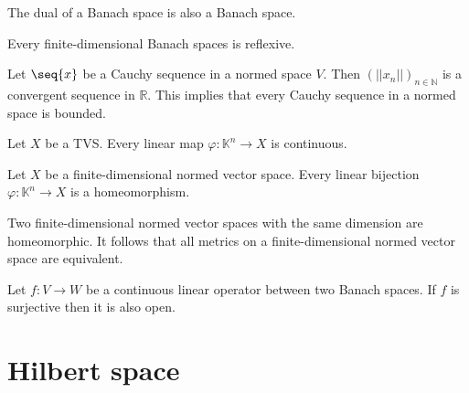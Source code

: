 
    \begin{property}
        The dual of a Banach space is also a Banach space.
    \end{property}
    \begin{property}
        Every finite-dimensional Banach spaces is reflexive.
    \end{property}

    \begin{property}
        Let $\seq{x}$ be a Cauchy sequence in a normed space $V$. Then $(||x_n||)_{n\in\mathbb{N}}$ is a convergent sequence in $\mathbb{R}$. This implies that every Cauchy sequence in a normed space is bounded.
    \end{property}

    \begin{property}
        Let $X$ be a TVS. Every linear map $\varphi:\mathbb{K}^n\rightarrow X$ is continuous.
    \end{property}
    \begin{property}
        Let $X$ be a finite-dimensional normed vector space. Every linear bijection $\varphi:\mathbb{K}^n\rightarrow X$ is a homeomorphism.
    \end{property}
    \begin{result}
        Two finite-dimensional normed vector spaces with the same dimension are homeomorphic. It follows that all metrics on a finite-dimensional normed vector space are equivalent.
    \end{result}

    \begin{theorem}
        Let $f:V\rightarrow W$ be a continuous linear operator between two Banach spaces. If $f$ is surjective then it is also open.
    \end{theorem}

\section{Hilbert space}

